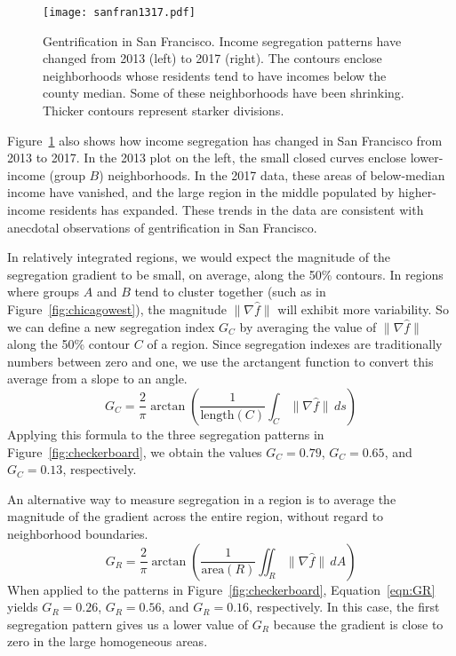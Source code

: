 \documentclass{article}
\theoremstyle{theorem}
\theoremstyle{definition}
\begin{document}
\begin{figure}
  \texttt{[image: sanfran1317.pdf]} %
  \caption{Gentrification in San Francisco. Income segregation patterns have changed from 2013 (left) to 2017 (right). The contours enclose neighborhoods whose residents tend to have incomes below the county median. Some of these neighborhoods have been shrinking. Thicker contours represent starker divisions.}
  \label{fig:sanfran1317}
\end{figure}

Figure~\ref{fig:sanfran1317} also shows how income segregation has changed in San Francisco from 2013 to 2017. In the 2013 plot on the left, the small closed curves enclose lower-income (group $B$) neighborhoods. In the 2017 data, these areas of below-median income have vanished, and the large region in the middle populated by higher-income residents has expanded. These trends in the data are consistent with anecdotal observations of gentrification in San Francisco. \cite{pogash15}

In relatively integrated regions, we would expect the magnitude of the segregation gradient to be small, on average, along the 50\% contours. In regions where groups $A$ and $B$ tend to cluster together (such as in Figure~\ref{fig:chicagowest}), the magnitude $\lVert \nabla \hat{f} \rVert$ will exhibit more variability. So we can define a new segregation index $G_C$ by averaging the value of  $\lVert \nabla \hat{f} \rVert$ along the 50\% contour $C$ of a region. Since segregation indexes are traditionally numbers between zero and one, we use the arctangent function to convert this average from a slope to an angle.
\begin{equation}
   G_C = \frac{2}{\pi} \arctan \left(\frac{1}{\mathrm{length}(C)} \int_C \lVert \nabla \hat{f} \rVert \, ds \right)
\end{equation}
Applying this formula to the three segregation patterns in Figure~\ref{fig:checkerboard}, we obtain the values $G_C=0.79$, $G_C=0.65$, and $G_C=0.13$, respectively.

An alternative way to measure segregation in a region is to average the magnitude of the gradient across the entire region, without regard to neighborhood boundaries.
\begin{equation}\label{eqn:GR}
   G_R = \frac{2}{\pi} \arctan \left(\frac{1}{\mathrm{area}(R)} \iint_R \lVert \nabla \hat{f} \rVert \, dA \right)
\end{equation}
When applied to the patterns in Figure~\ref{fig:checkerboard}, Equation~\ref{eqn:GR} yields $G_R = 0.26$, $G_R = 0.56$, and $G_R = 0.16$, respectively. In this case, the first segregation pattern gives us a lower value of $G_R$ because the gradient is close to zero in the large homogeneous areas.
\end{document}
